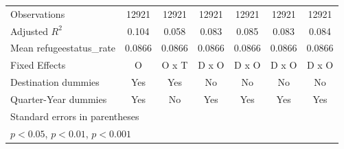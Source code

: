 \begin{table}[htbp]
\begin{tabular}{l*{6}{c}}
\hline
Observations        &       12921         &       12921         &       12921         &       12921         &       12921         &       12921         \\
Adjusted \(R^{2}\)  &       0.104         &       0.058         &       0.083         &       0.085         &       0.083         &       0.084         \\
Mean refugeestatus\_rate&      0.0866         &      0.0866         &      0.0866         &      0.0866         &      0.0866         &      0.0866         \\
Fixed Effects       &           O         &       O x T         &       D x O         &       D x O         &       D x O         &       D x O         \\
Destination dummies &         Yes         &         Yes         &          No         &          No         &          No         &          No         \\
Quarter-Year dummies&         Yes         &          No         &         Yes         &         Yes         &         Yes         &         Yes         \\
\hline\hline
\multicolumn{7}{l}{\footnotesize Standard errors in parentheses}\\
\multicolumn{7}{l}{\footnotesize \sym{*} \(p<0.05\), \sym{**} \(p<0.01\), \sym{***} \(p<0.001\)}\\
\end{tabular}
\end{table}
